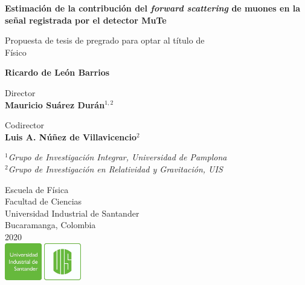 \documentclass[12pt]{report}
\begin{document}
\begin{titlepage}
   \begin{center}
       \vspace*{1cm}
       
       
       \large
       \textbf{Estimación de la contribución del \textit{forward scattering} de muones en la señal registrada por el detector MuTe}
       
 
       \vspace{1.5cm}
 
       \small
       Propuesta de tesis de pregrado para optar al título de \\
       Físico
       
       
       \normalsize
       \textbf{Ricardo de León Barrios}
       
       \small
       \vspace{1cm}
       Director\\
       \textbf{Mauricio Suárez Durán}$^{1,2}$
       
       \vspace{1cm}
       Codirector\\
       \textbf{Luis A. Núñez de Villavicencio}$^2$
       
       \vspace{1cm}
       $^1$\textit{Grupo de Investigación Integrar,
       Universidad de Pamplona}\\
       $^2$\textit{Grupo de Investigación en Relatividad y Gravitación, UIS}

 
       \vfill
       
       
 
 
       
 
       \small
       Escuela de Física\\
       Facultad de Ciencias\\
       Universidad Industrial de Santander\\
       Bucaramanga, Colombia\\
       2020\\
       \vspace{0.3cm}
       \includegraphics[width=0.25\textwidth]{logo/logoUIS.png}
 
   \end{center}
\end{titlepage}
\end{document}

